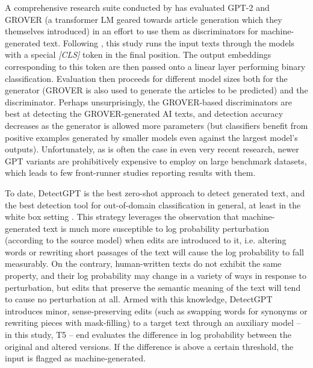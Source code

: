 A comprehensive research suite conducted by \citet{zellers2020defendingneuralfakenews} has evaluated GPT-2 and GROVER (a transformer LM geared towards article generation which they themselves introduced) in an effort to use them as discriminators for machine-generated text.
Following \citep{radford2018improving}, this study runs the input texts through the models with a special \emph{[CLS]} token in the final position.
The output embeddings corresponding to this token are then passed onto a linear layer performing binary classification.
Evaluation then proceeds for different model sizes both for the generator (GROVER is also used to generate the articles to be predicted) and the discriminator.
Perhaps unsurprisingly, the GROVER-based discriminators are best at detecting the GROVER-generated AI texts, and detection accuracy decreases as the generator is allowed more parameters (but classifiers benefit from positive examples generated by smaller models even against the largest model's outputs).
Unfortunately, as is often the case in even very recent research, newer GPT variants are prohibitively expensive \citep{galle2021unsupervised} to employ on large benchmark datasets, which leads to few front-runner studies reporting results with them.

To date, DetectGPT \citep{mitchell2023detectgptzeroshotmachinegeneratedtext} is the best zero-shot approach to detect generated text, and the best detection tool for out-of-domain classification in general, at least in the white box setting \citep{gehrmann2019gltrstatisticaldetectionvisualization}.
This strategy leverages the observation that machine-generated text is much more susceptible to log probability perturbation (according to the source model) when edits are introduced to it, i.e. altering words or rewriting short passages of the text will cause the log probability to fall measurably.
On the contrary, human-written texts do not exhibit the same property, and their log probability may change in a variety of ways in response to perturbation, but edits that preserve the semantic meaning of the text will tend to cause no perturbation at all.
Armed with this knowledge, DetectGPT introduces minor, sense-preserving edits (such as swapping words for synonyms or rewriting pieces with mask-filling) to a target text through an auxiliary model -- in this study, T5 \citep{raffel2023exploringlimitstransferlearning} -- end evaluates the difference in log probability between the original and altered versions.
If the difference is above a certain threshold, the input is flagged as machine-generated.

